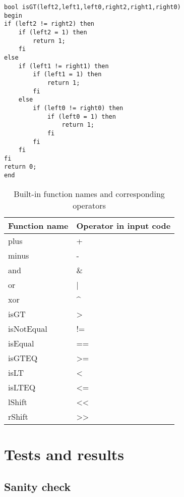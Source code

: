 \lstset{language=C}  
\begin{lstlisting}[caption={Greater than operator as a function in boolean program with bit length of 2.},label=lst:isGT]
bool isGT(left2,left1,left0,right2,right1,right0)
begin
if (left2 != right2) then
	if (left2 = 1) then
		return 1;
	fi
else 
	if (left1 != right1) then
		if (left1 = 1) then
			return 1;
		fi
	else 
		if (left0 != right0) then
			if (left0 = 1) then
				return 1;
			fi
		fi
	fi
fi
return 0;
end
\end{lstlisting}
\begin{table}[h]
\caption{Built-in function names and corresponding operators}
\label{tbl:fxNames}
\begin{tabular}{|l|l|}
\hline
Function name & Operator in input code   \\ \hline
plus          & +                        \\ \hline
minus         & -                        \\ \hline
and           & \&                       \\ \hline
or            & |                        \\ \hline
xor           & \textasciicircum         \\ \hline
isGT          & \textgreater             \\ \hline
isNotEqual    & !=                       \\ \hline
isEqual       & ==                       \\ \hline
isGTEQ        & \textgreater=            \\ \hline
isLT          & \textless                \\ \hline
isLTEQ        & \textless=               \\ \hline
lShift        & \textless\textless       \\ \hline
rShift        & \textgreater\textgreater \\ \hline
\end{tabular}
\end{table}
\section{Tests and results}
\subsection{Sanity check}

